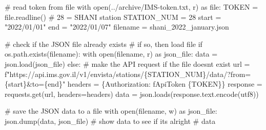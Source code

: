 \documentclass[
  letterpaper,
  DIV=11,
  numbers=noendperiod,
  oneside]{scrreprt}
\newenvironment{Shaded}{\begin{snugshade}}{\end{snugshade}}
\newcommand{\BuiltInTok}[1]{\textcolor[rgb]{0.00,0.23,0.31}{#1}}
\newcommand{\CommentTok}[1]{\textcolor[rgb]{0.37,0.37,0.37}{#1}}
\newcommand{\ControlFlowTok}[1]{\textcolor[rgb]{0.00,0.23,0.31}{#1}}
\newcommand{\DecValTok}[1]{\textcolor[rgb]{0.68,0.00,0.00}{#1}}
\newcommand{\ImportTok}[1]{\textcolor[rgb]{0.00,0.46,0.62}{#1}}
\newcommand{\NormalTok}[1]{\textcolor[rgb]{0.00,0.23,0.31}{#1}}
\newcommand{\OperatorTok}[1]{\textcolor[rgb]{0.37,0.37,0.37}{#1}}
\newcommand{\SpecialCharTok}[1]{\textcolor[rgb]{0.37,0.37,0.37}{#1}}
\newcommand{\SpecialStringTok}[1]{\textcolor[rgb]{0.13,0.47,0.30}{#1}}
\newcommand{\StringTok}[1]{\textcolor[rgb]{0.13,0.47,0.30}{#1}}
\begin{document}
\begin{Shaded}
\begin{Highlighting}[]
\CommentTok{\# read token from file}
\ControlFlowTok{with} \BuiltInTok{open}\NormalTok{(}\StringTok{\textquotesingle{}../archive/IMS{-}token.txt\textquotesingle{}}\NormalTok{, }\StringTok{\textquotesingle{}r\textquotesingle{}}\NormalTok{) }\ImportTok{as} \BuiltInTok{file}\NormalTok{:}
\NormalTok{    TOKEN }\OperatorTok{=} \BuiltInTok{file}\NormalTok{.readline()}
\CommentTok{\# 28 = SHANI station}
\NormalTok{STATION\_NUM }\OperatorTok{=} \DecValTok{28}
\NormalTok{start }\OperatorTok{=} \StringTok{"2022/01/01"}
\NormalTok{end }\OperatorTok{=} \StringTok{"2022/01/07"}
\NormalTok{filename }\OperatorTok{=} \StringTok{\textquotesingle{}shani\_2022\_january.json\textquotesingle{}}

\CommentTok{\# check if the JSON file already exists}
\CommentTok{\# if so, then load file}
\ControlFlowTok{if}\NormalTok{ os.path.exists(filename):}
    \ControlFlowTok{with} \BuiltInTok{open}\NormalTok{(filename, }\StringTok{\textquotesingle{}r\textquotesingle{}}\NormalTok{) }\ImportTok{as}\NormalTok{ json\_file:}
\NormalTok{        data }\OperatorTok{=}\NormalTok{ json.load(json\_file)}
\ControlFlowTok{else}\NormalTok{:}
    \CommentTok{\# make the API request if the file doesn\textquotesingle{}t exist}
\NormalTok{    url }\OperatorTok{=} \SpecialStringTok{f"https://api.ims.gov.il/v1/envista/stations/}\SpecialCharTok{\{}\NormalTok{STATION\_NUM}\SpecialCharTok{\}}\SpecialStringTok{/data/?from=}\SpecialCharTok{\{}\NormalTok{start}\SpecialCharTok{\}}\SpecialStringTok{\&to=}\SpecialCharTok{\{}\NormalTok{end}\SpecialCharTok{\}}\SpecialStringTok{"}
\NormalTok{    headers }\OperatorTok{=}\NormalTok{ \{}\StringTok{\textquotesingle{}Authorization\textquotesingle{}}\NormalTok{: }\SpecialStringTok{f\textquotesingle{}ApiToken }\SpecialCharTok{\{}\NormalTok{TOKEN}\SpecialCharTok{\}}\SpecialStringTok{\textquotesingle{}}\NormalTok{\}}
\NormalTok{    response }\OperatorTok{=}\NormalTok{ requests.get(url, headers}\OperatorTok{=}\NormalTok{headers)}
\NormalTok{    data }\OperatorTok{=}\NormalTok{ json.loads(response.text.encode(}\StringTok{\textquotesingle{}utf8\textquotesingle{}}\NormalTok{))}
    
    \CommentTok{\# save the JSON data to a file}
    \ControlFlowTok{with} \BuiltInTok{open}\NormalTok{(filename, }\StringTok{\textquotesingle{}w\textquotesingle{}}\NormalTok{) }\ImportTok{as}\NormalTok{ json\_file:}
\NormalTok{        json.dump(data, json\_file)}
\CommentTok{\# show data to see if it\textquotesingle{}s alright}
\CommentTok{\# data}
\end{Highlighting}
\end{Shaded}
\end{document}
